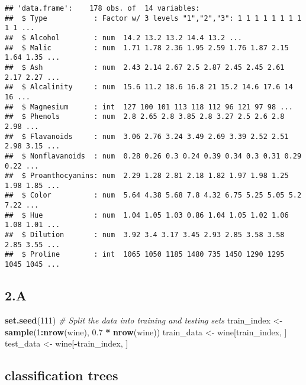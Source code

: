 \documentclass[
]{article}
\newenvironment{Shaded}{\begin{snugshade}}{\end{snugshade}}
\newcommand{\CommentTok}[1]{\textcolor[rgb]{0.56,0.35,0.01}{\textit{#1}}}
\newcommand{\DecValTok}[1]{\textcolor[rgb]{0.00,0.00,0.81}{#1}}
\newcommand{\FloatTok}[1]{\textcolor[rgb]{0.00,0.00,0.81}{#1}}
\newcommand{\FunctionTok}[1]{\textcolor[rgb]{0.13,0.29,0.53}{\textbf{#1}}}
\newcommand{\NormalTok}[1]{#1}
\newcommand{\OtherTok}[1]{\textcolor[rgb]{0.56,0.35,0.01}{#1}}
\newcommand{\SpecialCharTok}[1]{\textcolor[rgb]{0.81,0.36,0.00}{\textbf{#1}}}
\begin{document}
\begin{verbatim}
## 'data.frame':    178 obs. of  14 variables:
##  $ Type           : Factor w/ 3 levels "1","2","3": 1 1 1 1 1 1 1 1 1 1 ...
##  $ Alcohol        : num  14.2 13.2 13.2 14.4 13.2 ...
##  $ Malic          : num  1.71 1.78 2.36 1.95 2.59 1.76 1.87 2.15 1.64 1.35 ...
##  $ Ash            : num  2.43 2.14 2.67 2.5 2.87 2.45 2.45 2.61 2.17 2.27 ...
##  $ Alcalinity     : num  15.6 11.2 18.6 16.8 21 15.2 14.6 17.6 14 16 ...
##  $ Magnesium      : int  127 100 101 113 118 112 96 121 97 98 ...
##  $ Phenols        : num  2.8 2.65 2.8 3.85 2.8 3.27 2.5 2.6 2.8 2.98 ...
##  $ Flavanoids     : num  3.06 2.76 3.24 3.49 2.69 3.39 2.52 2.51 2.98 3.15 ...
##  $ Nonflavanoids  : num  0.28 0.26 0.3 0.24 0.39 0.34 0.3 0.31 0.29 0.22 ...
##  $ Proanthocyanins: num  2.29 1.28 2.81 2.18 1.82 1.97 1.98 1.25 1.98 1.85 ...
##  $ Color          : num  5.64 4.38 5.68 7.8 4.32 6.75 5.25 5.05 5.2 7.22 ...
##  $ Hue            : num  1.04 1.05 1.03 0.86 1.04 1.05 1.02 1.06 1.08 1.01 ...
##  $ Dilution       : num  3.92 3.4 3.17 3.45 2.93 2.85 3.58 3.58 2.85 3.55 ...
##  $ Proline        : int  1065 1050 1185 1480 735 1450 1290 1295 1045 1045 ...
\end{verbatim}

\subsection{2.A}\label{a-1}

\begin{Shaded}
\begin{Highlighting}[]
\FunctionTok{set.seed}\NormalTok{(}\DecValTok{111}\NormalTok{)}
\CommentTok{\# Split the data into training and testing sets}
\NormalTok{train\_index }\OtherTok{\textless{}{-}} \FunctionTok{sample}\NormalTok{(}\DecValTok{1}\SpecialCharTok{:}\FunctionTok{nrow}\NormalTok{(wine), }\FloatTok{0.7} \SpecialCharTok{*} \FunctionTok{nrow}\NormalTok{(wine))}
\NormalTok{train\_data }\OtherTok{\textless{}{-}}\NormalTok{ wine[train\_index, ]}
\NormalTok{test\_data }\OtherTok{\textless{}{-}}\NormalTok{ wine[}\SpecialCharTok{{-}}\NormalTok{train\_index, ]}
\end{Highlighting}
\end{Shaded}

\subsection{classification trees}\label{classification-trees}
\end{document}
